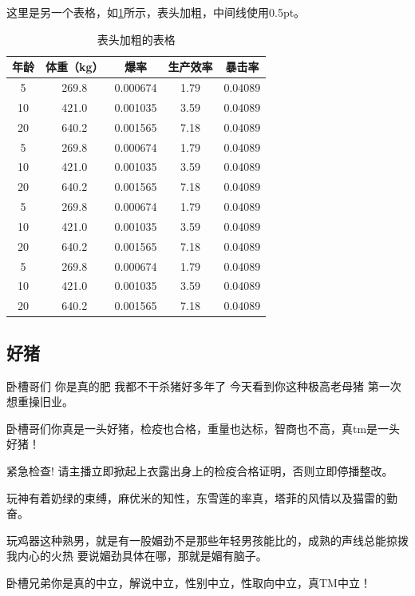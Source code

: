 这里是另一个表格，如\ref{tab:table2}所示，表头加粗，中间线使用0.5pt。

\begin{table}[htbp]
\caption{表头加粗的表格}\label{tab:table2}
\vspace{0.5em}\centering\wuhao
\begin{tabular}{ccccc}
\toprule[1.5pt]
\textbf{年龄} & \textbf{ 体重（kg）} & \textbf{ 爆率} & \textbf{ 生产效率} & \textbf{暴击率 }\\
\midrule[0.5pt]
 5 & 269.8 & 0.000674 & 1.79 & 0.04089\\
10 & 421.0 & 0.001035 & 3.59 & 0.04089\\
20 & 640.2 & 0.001565 & 7.18 & 0.04089\\
 5 & 269.8 & 0.000674 & 1.79 & 0.04089\\
10 & 421.0 & 0.001035 & 3.59 & 0.04089\\
20 & 640.2 & 0.001565 & 7.18 & 0.04089\\
 5 & 269.8 & 0.000674 & 1.79 & 0.04089\\
10 & 421.0 & 0.001035 & 3.59 & 0.04089\\
20 & 640.2 & 0.001565 & 7.18 & 0.04089\\
 5 & 269.8 & 0.000674 & 1.79 & 0.04089\\
10 & 421.0 & 0.001035 & 3.59 & 0.04089\\
20 & 640.2 & 0.001565 & 7.18 & 0.04089\\
\bottomrule[1.5pt]
\end{tabular}
\vspace{\baselineskip}
\end{table}

\subsection{好猪}

卧槽哥们 你是真的肥 我都不干杀猪好多年了 今天看到你这种极高老母猪 第一次想重操旧业。

卧槽哥们你真是一头好猪，检疫也合格，重量也达标，智商也不高，真tm是一头好猪！

紧急检查! 请主播立即掀起上衣露出身上的检疫合格证明，否则立即停播整改。

玩神有着奶绿的束缚，麻优米的知性，东雪莲的率真，塔菲的风情以及猫雷的勤奋。

玩鸡器这种熟男，就是有一股媚劲不是那些年轻男孩能比的，成熟的声线总能掠拨我内心的火热
要说媚劲具体在哪，那就是媚有脑子。

卧槽兄弟你是真的中立，解说中立，性别中立，性取向中立，真TM中立！



